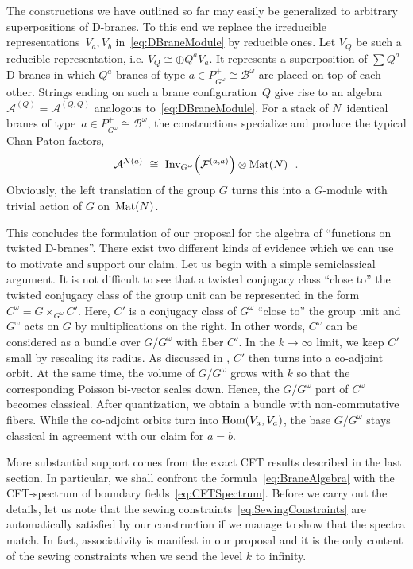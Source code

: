 \documentclass[12pt,a4paper]{article}
\newcommand{\mc}{\mathcal} %
\def\Inv{\text{\rm Inv}}
\def\iG{G^\omega} %
\def\bL{\mc{B}} %
\def\reps{P^+} %
\def\treps{\bL^\omega} %
\def\Hom{{\text{\rm Hom}}} %
\def\Mat{{\text{\rm Mat}}} %
\begin{document}
The constructions we have outlined so far may easily be generalized
to arbitrary superpositions of D-branes. To this end we replace 
the irreducible representations~$V_a,V_b$ in~\eqref{eq:DBraneModule} 
by reducible ones. Let $V_{Q}$ be such a reducible representation, 
i.e. $V_{Q}\cong\oplus Q^a V_a$. It represents a superposition 
of $\sum Q^a$ D-branes in which $Q^a$ branes of type $a\in
\reps_{\iG}\cong\treps$ are placed on top of each other. 
Strings ending on such a brane configuration~$Q$ give rise to 
an algebra $\mc{A}^{(Q)}=\mc{A}^{(Q,Q)}$ analogous to~\eqref{eq:DBraneModule}. 
For a stack of $N$~identical branes of type~$a\in\reps_{\iG}
\cong\treps$, the constructions specialize and produce the 
typical Chan-Paton factors, 
\begin{equation}
  \label{eq:BraneStackAlgebra}
  \mc{A}^{N(a)}
  \ \cong\ \Inv_{\iG}\Bigl(\mc{F}^{(a,a)}\Bigr) \otimes \Mat(N)
  \ \ . 
\end{equation}
Obviously, the left translation of the group $G$ turns this into 
a $G$-module with trivial action of $G$ on~$\Mat(N)$.
\medskip 


This concludes the formulation of our proposal for the algebra 
of ``functions on twisted D-branes''. There exist two different
kinds of evidence which we can use to motivate and support our 
claim. Let us begin with a simple semiclassical argument. It 
is not difficult to see that a twisted conjugacy class ``close to'' 
the twisted conjugacy class of the group unit can be represented 
in the form $C^\omega = G \times_{\iG} C'$. Here, $C'$ is a 
conjugacy class of $\iG$ ``close to'' the group unit and $\iG$ 
acts on $G$ by multiplications on the right. In other words, 
$C^\omega$ can be considered as a bundle over $G/\iG$ with 
fiber $C'$. In the $k\to \infty$ limit, we keep $C'$ small by
rescaling its radius. As discussed in \cite{Alekseev:1999bs}, 
$C'$ then turns into a co-adjoint orbit. At the same time, the 
volume of $G/\iG$ grows with $k$ so that the corresponding Poisson 
bi-vector scales down. Hence, the $G/\iG$ part of $C^\omega$ 
becomes classical. After quantization, we obtain a bundle with 
non-commutative fibers. While the co-adjoint orbits turn 
into $\Hom(V_a,V_a)$, the base $G/\iG$ stays classical in 
agreement with our claim for $a = b$.  
\smallskip

More substantial support comes from the exact CFT results 
described in the last section. In particular, we shall 
confront the formula~\eqref{eq:BraneAlgebra} with the 
CFT-spectrum of boundary fields~\eqref{eq:CFTSpectrum}. 
Before we carry out the details, let us note that the  
sewing constraints~\eqref{eq:SewingConstraints} are 
automatically satisfied by our construction if we manage
to show that the spectra match. In fact, associativity is
manifest in our proposal and it is the only content of the 
sewing constraints when we send the level $k$ to infinity. 
\smallskip
\end{document}
